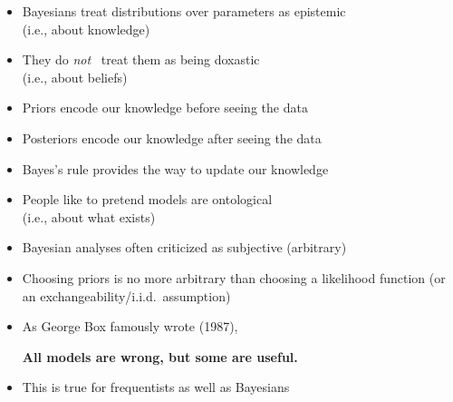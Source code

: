 \documentclass[10pt]{report}
\begin{document}
%
\begin{itemize}
\item Bayesians treat distributions over parameters as epistemic \\
(i.e., about knowledge) 
\item They do \emph{not} \ treat them as being doxastic \\
(i.e., about beliefs)
\item Priors encode our knowledge before seeing the data
\item Posteriors encode our knowledge after seeing the data
\item Bayes's rule provides the way to update our knowledge
\item People like to pretend models are ontological \\
(i.e., about what exists)
\end{itemize}

%
\begin{itemize}
\item Bayesian analyses often criticized as subjective (arbitrary)
\item Choosing priors is no more arbitrary than choosing a likelihood
  function (or an exchangeability/i.i.d.\ assumption)
\item As George Box famously wrote (1987),
\begin{center}
\large
{\bfseries All models are wrong, but some are useful.}
\end{center}
\item This is true for frequentists as well as Bayesians
\end{itemize}


\end{document}
